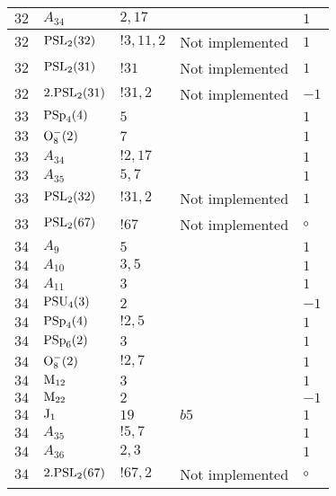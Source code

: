 \documentclass[a4paper, 11pt]{article}
\begin{document}
\begin{longtable}{lllll}
        $ 32 $ & $ A_{34} $ & $ 2, 17 $ & $ ~ $ & $ 1$ \\ \hline
        $ 32 $ & $ {\rm PSL}_{2}(32) $ & $ !3, 11, 2 $ &  Not implemented & $ 1$ \\ \hline
        $ 32 $ & $ {\rm PSL}_{2}(31) $ & $ !31 $ &  Not implemented & $ 1$ \\ \hline
        $ 32 $ & $ 2.{\rm PSL}_{2}(31) $ & $ !31, 2 $ &  Not implemented & $ -1$ \\ \hline
        $ 33 $ & $ {\rm PSp}_{4}(4) $ & $ 5 $ & $ ~ $ & $ 1$ \\ \hline
        $ 33 $ & $ {\rm O}_{8}^-(2) $ & $ 7 $ & $ ~ $ & $ 1$ \\ \hline
        $ 33 $ & $ A_{34} $ & $ !2, 17 $ & $ ~ $ & $ 1$ \\ \hline
        $ 33 $ & $ A_{35} $ & $ 5, 7 $ & $ ~ $ & $ 1$ \\ \hline
        $ 33 $ & $ {\rm PSL}_{2}(32) $ & $ !31, 2 $ &  Not implemented & $ 1$ \\ \hline
        $ 33 $ & $ {\rm PSL}_{2}(67) $ & $ !67 $ &  Not implemented &  $\circ$ \\ \hline
        $ 34 $ & $ A_{9} $ & $ 5 $ & $ ~ $ & $ 1$ \\ \hline
        $ 34 $ & $ A_{10} $ & $ 3,5 $ & $ ~ $ & $ 1$ \\ \hline
        $ 34 $ & $ A_{11} $ & $ 3 $ & $ ~ $ & $ 1$ \\ \hline
        $ 34 $ & $ {\rm PSU}_{4}(3) $ & $ 2 $ & $ ~ $ & $ -1$ \\ \hline
        $ 34 $ & $ {\rm PSp}_{4}(4) $ & $ ! 2,5 $ & $ ~ $ & $ 1$ \\ \hline
        $ 34 $ & $ {\rm PSp}_{6}(2) $ & $ 3 $ & $ ~ $ & $ 1$ \\ \hline
        $ 34 $ & $ {\rm O}_{8}^-(2) $ & $ ! 2,7 $ & $ ~ $ & $ 1$ \\ \hline
        $ 34 $ & $ {\rm M}_{12} $ & $ 3 $ & $ ~ $ & $ 1$ \\ \hline
        $ 34 $ & $ {\rm M}_{22} $ & $ 2 $ & $ ~ $ & $ -1$ \\ \hline
        $ 34 $ & $ {\rm J}_1 $ & $ 19 $ & $ b5 $ & $ 1$ \\ \hline
        $ 34 $ & $ A_{35} $ & $ !5, 7 $ & $ ~ $ & $ 1$ \\ \hline
        $ 34 $ & $ A_{36} $ & $ 2, 3 $ & $ ~ $ & $ 1$ \\ \hline
        $ 34 $ & $ 2.{\rm PSL}_{2}(67) $ & $ !67, 2 $ &  Not implemented &  $\circ$ \\ \hline

\end{longtable}
\end{document}
